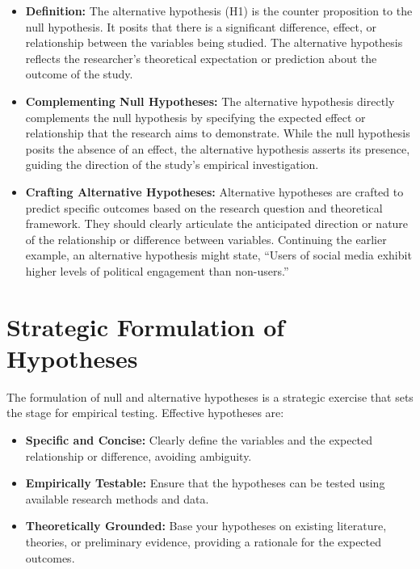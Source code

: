 \documentclass[
]{book}
\providecommand{\tightlist}{%
  \setlength{\itemsep}{0pt}\setlength{\parskip}{0pt}}
\begin{document}
\begin{itemize}
\item
  \textbf{Definition:} The alternative hypothesis (H1) is the counter proposition to the null hypothesis. It posits that there is a significant difference, effect, or relationship between the variables being studied. The alternative hypothesis reflects the researcher's theoretical expectation or prediction about the outcome of the study.
\item
  \textbf{Complementing Null Hypotheses:} The alternative hypothesis directly complements the null hypothesis by specifying the expected effect or relationship that the research aims to demonstrate. While the null hypothesis posits the absence of an effect, the alternative hypothesis asserts its presence, guiding the direction of the study's empirical investigation.
\item
  \textbf{Crafting Alternative Hypotheses:} Alternative hypotheses are crafted to predict specific outcomes based on the research question and theoretical framework. They should clearly articulate the anticipated direction or nature of the relationship or difference between variables. Continuing the earlier example, an alternative hypothesis might state, ``Users of social media exhibit higher levels of political engagement than non-users.''
\end{itemize}

\hypertarget{strategic-formulation-of-hypotheses}{%
\section{Strategic Formulation of Hypotheses}\label{strategic-formulation-of-hypotheses}}

The formulation of null and alternative hypotheses is a strategic exercise that sets the stage for empirical testing. Effective hypotheses are:

\begin{itemize}
\tightlist
\item
  \textbf{Specific and Concise:} Clearly define the variables and the expected relationship or difference, avoiding ambiguity.
\item
  \textbf{Empirically Testable:} Ensure that the hypotheses can be tested using available research methods and data.
\item
  \textbf{Theoretically Grounded:} Base your hypotheses on existing literature, theories, or preliminary evidence, providing a rationale for the expected outcomes.
\end{itemize}
\end{document}
